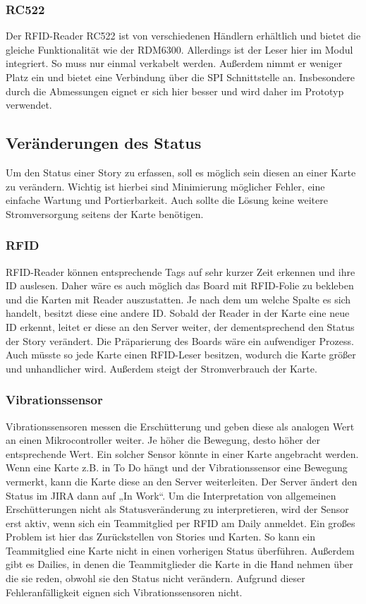 \documentclass[12pt,titlepage]{scrartcl}
\begin{document}
			\subsubsection{RC522}
			Der RFID-Reader RC522 ist von verschiedenen Händlern erhältlich und bietet die gleiche Funktionalität wie der RDM6300. Allerdings ist der Leser hier im Modul integriert. So muss nur einmal verkabelt werden. Außerdem nimmt er weniger Platz ein und bietet eine Verbindung über die SPI Schnittstelle an. Insbesondere durch die Abmessungen eignet er sich hier besser und wird daher im Prototyp verwendet.
		\subsection{Veränderungen des Status} \label{changeStatus}
		Um den Status einer Story zu erfassen, soll es möglich sein diesen an einer Karte zu verändern. Wichtig ist hierbei sind Minimierung möglicher Fehler, eine einfache Wartung und Portierbarkeit. Auch sollte die Lösung keine weitere Stromversorgung seitens der Karte benötigen.
			\subsubsection{RFID}
			RFID-Reader können entsprechende Tags auf sehr kurzer Zeit erkennen und ihre ID auslesen. Daher wäre es auch möglich das Board mit RFID-Folie zu bekleben und die Karten mit Reader auszustatten. Je nach dem um welche Spalte es sich handelt, besitzt diese eine andere ID. Sobald der Reader in der Karte eine neue ID erkennt, leitet er diese an den Server weiter, der dementsprechend den Status der Story verändert. Die Präparierung des Boards wäre ein aufwendiger Prozess. Auch müsste so jede Karte einen RFID-Leser besitzen, wodurch die Karte größer und unhandlicher wird. Außerdem steigt der Stromverbrauch der Karte.
			\subsubsection{Vibrationssensor}
			Vibrationssensoren messen die Erschütterung und geben diese als analogen Wert an einen Mikrocontroller weiter. Je höher die Bewegung, desto höher der entsprechende Wert. Ein solcher Sensor könnte in einer Karte angebracht werden. Wenn eine Karte z.B. in To Do hängt und der Vibrationssensor eine Bewegung vermerkt, kann die Karte diese an den Server weiterleiten. Der Server ändert den Status im JIRA dann auf „In Work“. Um die Interpretation von allgemeinen Erschütterungen nicht als Statusveränderung zu interpretieren, wird der Sensor erst aktiv, wenn sich ein Teammitglied per RFID am Daily anmeldet. Ein großes Problem ist hier das Zurückstellen von Stories und Karten. So kann ein Teammitglied eine Karte nicht in einen vorherigen Status überführen. Außerdem gibt es Dailies, in denen die Teammitglieder die Karte in die Hand nehmen über die sie reden, obwohl sie den Status nicht verändern. Aufgrund dieser Fehleranfälligkeit eignen sich Vibrationssensoren nicht.
\end{document}
